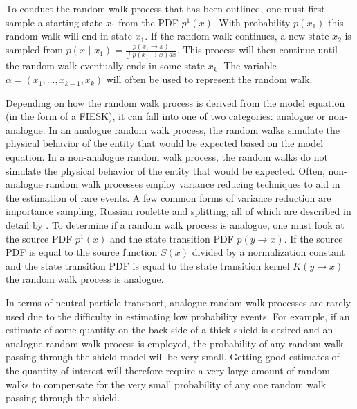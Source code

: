To conduct the random walk process that has been outlined, one must first 
sample a starting state $x_1$ from the PDF $p^1(x)$. With probability $p(x_1)$ 
this random walk will end in state $x_1$. If the random walk continues, a new 
state $x_2$ is sampled from 
$p(x \text{ | } x_1) = \frac{p(x_1 \to x)}{\int p(x_1 \to x)dx}$. This process will then continue 
until the random walk eventually ends in some state $x_k$. The variable 
$\alpha = (x_1,\ldots,x_{k-1},x_k)$ will often be used to represent the random 
walk. 

Depending on how the random walk process is derived from the model equation (in
the form of a FIESK), it can fall into one of two categories: analogue or 
non-analogue. In an analogue random walk process, the random walks simulate 
the physical behavior of the entity that would be expected based on the model 
equation. In a non-analogue random walk process, the random walks do not 
simulate the physical behavior of the entity that would be expected. Often, 
non-analogue random walk processes employ variance reducing techniques to aid 
in the estimation of rare events. A few common forms of variance reduction are
importance sampling, Russian roulette and splitting, all of which are described
in detail by \citet{spanier_monte_1969}. To determine if a random walk
process is analogue, one must look at the source PDF $p^1(x)$ and the state 
transition PDF $p(y \to x)$. If the source PDF is equal to the source function
$S(x)$ divided by a normalization constant and the state transition PDF is 
equal to the state transition kernel $K(y \to x)$ the random walk process is 
analogue. 

In terms of neutral particle transport, analogue random walk processes are 
rarely used due to the difficulty in estimating low probability events. For
example, if an estimate of some quantity on the back side of a thick shield is 
desired and an analogue random walk process is employed, the probability of any 
random walk passing through the shield model will be very small. Getting good
estimates of the quantity of interest will therefore require a very large
amount of random walks to compensate for the very small probability of any one
random walk passing through the shield. 

